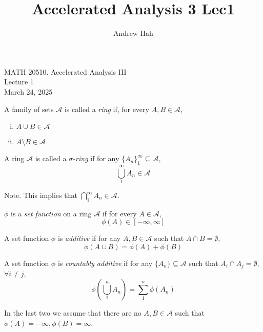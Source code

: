 \documentclass[11pt]{article}
\title{Accelerated Analysis 3 Lec1}
\author{Andrew Hah}
\begin{document}
\pagestyle{plain}
\begin{center}
{\Large MATH 20510. Accelerated Analysis III} \\
{\Large Lecture 1} \\
\vspace{.2in}
March 24, 2025
\end{center}

\begin{definition}
    A family of sets $\mathscr{A}$ is called a \emph{ring} if, for every $A, B \in \mathscr{A}$, \begin{enumerate} [(i), nosep, left=0pt]
        \item $A \cup B \in \mathscr{A}$
        \item $A \setminus B \in \mathscr{A}$
    \end{enumerate}
\end{definition}

\begin{definition}
    A ring $\mathscr{A}$ is called a \emph{$\sigma$-ring} if for any $\{ A_n \}_1^\infty \subseteq \mathscr{A}$, $$\bigcup_1^\infty A_n \in \mathscr{A}$$
\end{definition}

Note. This implies that $\bigcap_1^\infty A_n \in \mathscr{A}$. 

\begin{definition}
    $\phi$ is a \emph{set function} on a ring $\mathscr{A}$ if for every $A \in \mathscr{A}$, $$\phi(A) \in [-\infty, \infty]$$
\end{definition}

\begin{definition}
    A set function $\phi$ is \emph{additive} if for any $A, B \in \mathscr{A}$ such that $A \cap B = \emptyset$, $$\phi(A \cup B) = \phi(A) + \phi(B)$$
\end{definition}

\begin{definition}
    A set function $\phi$ is \emph{countably additive} if for any $\{ A_n \} \subseteq \mathscr{A}$ such that $A_i \cap A_j = \emptyset$, $\forall i \neq j$, $$\phi \left( \bigcup_1^n A_n \right) = \sum_1^n \phi(A_n)$$
\end{definition}
In the last two we assume that there are no $A, B \in \mathscr{A}$ such that $\phi(A) = -\infty, \phi(B) = \infty$. 
\end{document}
